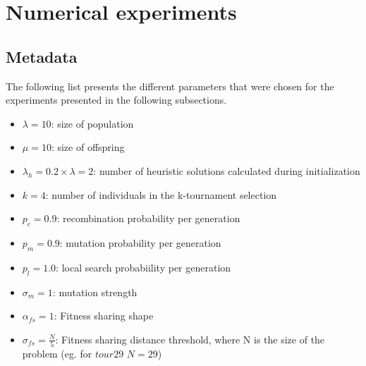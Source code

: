 \documentclass[a4paper,10pt]{article}
\newcommand{\ReplaceMe}[1]{{\color{blue}#1}}
\newcommand{\RemoveMe}[1]{{\color{purple}#1}}
\begin{document}
\section{Numerical experiments} \label{s:numerical_experiments}


\subsection{Metadata} \label{ss:metadata}



The following list presents the different parameters that were chosen for the experiments presented in the following subsections. 
\begin{itemize}
\item $\lambda = 10$: size of population
\item $\mu = 10$: size of offspring
\item $\lambda_h = 0.2 \times \lambda = 2$: number of heuristic solutions calculated during initialization
\item $k = 4$: number of individuals in the k-tournament selection
\item $p_c = 0.9$: recombination probability per generation
\item $p_m = 0.9$: mutation probability per generation
\item $p_l = 1.0$: local search probabiility per generation
\item $\sigma_m = 1$: mutation strength
\item $\alpha_{fs} = 1$: Fitness sharing shape
\item $\sigma_{fs} = \frac{N}{5}$: Fitness sharing distance threshold, where N is the size of the problem (eg. for $tour29$ $N=29$)
\end{itemize}
\end{document}
